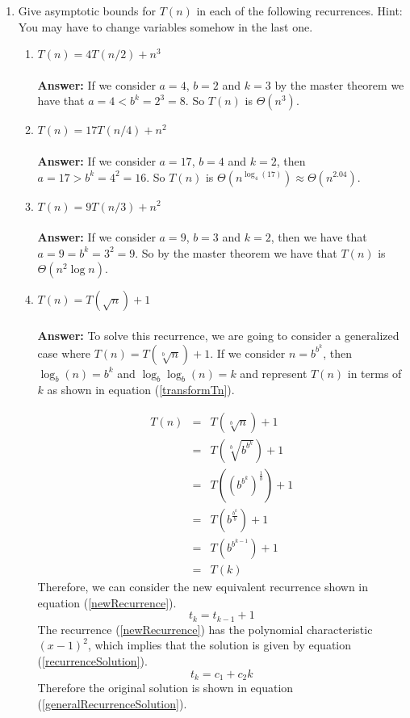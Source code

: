 \documentclass[12pt]{scrartcl}
\begin{document}
\begin{enumerate}
\begin{enumerate}
			
		\end{enumerate}
	
	\item Give asymptotic bounds for $T(n)$ in each of the following recurrences. Hint: You may have to change variables somehow in the last one.
		\begin{enumerate}
			\item $T(n) = 4T(n / 2) + n^3$\\
			\\
			\textbf{Answer: } If we consider $a = 4$, $b = 2$ and $k = 3$ by the master theorem we have that $a = 4 < b^k = 2^3 = 8$. So $T(n)$ is $\Theta(n^3)$.
			\\
			\item $T(n) = 17T(n / 4) + n^2$\\
			\\
			\textbf{Answer: } If we consider $a = 17$, $b = 4$ and $k = 2$, then $a = 17 > b^k = 4^2 = 16$. So $T(n)$ is $\Theta(n^{\log_4(17)}) \approx \Theta(n^{2.04})$.
			\\
			\item $T(n) = 9T(n / 3) + n^2$\\
			\\
			\textbf{Answer: } If we consider $a = 9$, $b = 3$ and $k = 2$, then we have that $a = 9 = b^k = 3^2 = 9$. So by the master theorem we have that $T(n)$ is $\Theta(n^2 \log n)$.
			\\
			\item $T(n) = T(\sqrt{n}) + 1$\\
			\\
			\textbf{Answer: } To solve this recurrence, we are going to consider a generalized case where $T(n) = T(\sqrt[b]{n}) + 1$. If we consider $n = b^{b^k}$, then $\log_b(n) = b^k$ and $\log_b \log_b(n) = k$ and represent $T(n)$ in terms of $k$ as shown in equation (\ref{transformTn}).

			\begin{eqnarray}\label{transformTn}
				T(n)	&	=	&	T(\sqrt[b]{n}) + 1 \nonumber \\
					&	=	&	T(\sqrt[b]{b^{b^k}}) + 1 \nonumber \\
					&	=	&	T((b^{b^k})^{\frac{1}{b}}) + 1 \nonumber \\
					&	=	&	T(b^{\frac{b^k}{b}}) + 1 \nonumber \\
					&	=	&	T(b^{b^{k -1}}) + 1 \nonumber \\
					&	=	&	T(k)
			\end{eqnarray}
			Therefore, we can consider the new equivalent recurrence shown in equation (\ref{newRecurrence}).
			\begin{equation}\label{newRecurrence}
				t_k	= t_{k -1} + 1
			\end{equation}
			The recurrence (\ref{newRecurrence}) has the polynomial characteristic $(x - 1)^2$, which implies that the solution is given by equation (\ref{recurrenceSolution}).
			\begin{equation}\label{recurrenceSolution}
			t_k = c_1 + c_2k 
			\end{equation}
			Therefore the original solution is shown in  equation (\ref{generalRecurrenceSolution}).
			

\end{enumerate}
\end{enumerate}
\end{document}
